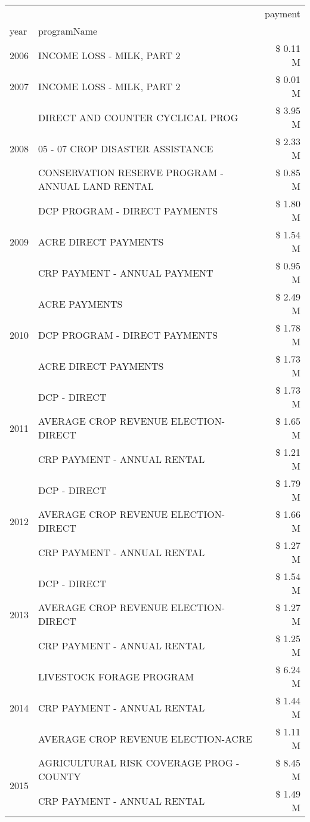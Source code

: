 \begin{tabular}{llr}
\toprule
 &  & payment \\
year & programName &  \\
\midrule
2006 & INCOME LOSS - MILK, PART 2 & \$ 0.11 M \\
\cline{1-3}
2007 & INCOME LOSS - MILK, PART 2 & \$ 0.01 M \\
\cline{1-3}
\multirow[t]{3}{*}{2008} & DIRECT AND COUNTER CYCLICAL PROG & \$ 3.95 M \\
 & 05 - 07 CROP DISASTER ASSISTANCE & \$ 2.33 M \\
 & CONSERVATION RESERVE PROGRAM - ANNUAL LAND RENTAL & \$ 0.85 M \\
\cline{1-3}
\multirow[t]{3}{*}{2009} & DCP PROGRAM - DIRECT PAYMENTS & \$ 1.80 M \\
 & ACRE DIRECT PAYMENTS & \$ 1.54 M \\
 & CRP PAYMENT - ANNUAL PAYMENT & \$ 0.95 M \\
\cline{1-3}
\multirow[t]{3}{*}{2010} & ACRE PAYMENTS & \$ 2.49 M \\
 & DCP PROGRAM - DIRECT PAYMENTS & \$ 1.78 M \\
 & ACRE DIRECT PAYMENTS & \$ 1.73 M \\
\cline{1-3}
\multirow[t]{3}{*}{2011} & DCP - DIRECT & \$ 1.73 M \\
 & AVERAGE CROP REVENUE ELECTION-DIRECT & \$ 1.65 M \\
 & CRP PAYMENT - ANNUAL RENTAL & \$ 1.21 M \\
\cline{1-3}
\multirow[t]{3}{*}{2012} & DCP - DIRECT & \$ 1.79 M \\
 & AVERAGE CROP REVENUE ELECTION-DIRECT & \$ 1.66 M \\
 & CRP PAYMENT - ANNUAL RENTAL & \$ 1.27 M \\
\cline{1-3}
\multirow[t]{3}{*}{2013} & DCP - DIRECT & \$ 1.54 M \\
 & AVERAGE CROP REVENUE ELECTION-DIRECT & \$ 1.27 M \\
 & CRP PAYMENT - ANNUAL RENTAL & \$ 1.25 M \\
\cline{1-3}
\multirow[t]{3}{*}{2014} & LIVESTOCK FORAGE PROGRAM & \$ 6.24 M \\
 & CRP PAYMENT - ANNUAL RENTAL & \$ 1.44 M \\
 & AVERAGE CROP REVENUE ELECTION-ACRE & \$ 1.11 M \\
\cline{1-3}
\multirow[t]{3}{*}{2015} & AGRICULTURAL RISK COVERAGE PROG - COUNTY & \$ 8.45 M \\
 & CRP PAYMENT - ANNUAL RENTAL & \$ 1.49 M \\

\end{tabular}

